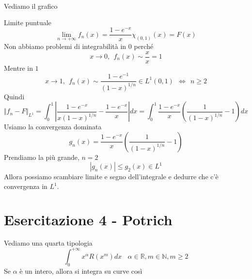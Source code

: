 Vediamo il grafico


Limite puntuale
\begin{equation*}
\lim\limits _{n\rightarrow +\infty } f_{n}( x) =\frac{1-e^{-x}}{x} \chi _{( 0,1)} (x)=F( x)
\end{equation*}
Non abbiamo problemi di integrabilità in $0$ perché
\begin{equation*}
x\rightarrow 0,\ \ f_{n}( x) \sim \frac{x}{x} =1
\end{equation*}
Mentre in $1$
\begin{equation*}
x\rightarrow 1,\ \ f_{n}( x) \sim \frac{1-e^{-1}}{( 1-x)^{1/n}} \in L^{1}( 0,1) \ \ \iff \ \ n\geqslant 2
\end{equation*}
Quindi
\begin{equation*}
\Vert f_{n} -F\Vert _{L^{1}} =\int ^{1}_{0}\left| \frac{1-e^{-x}}{x( 1-x)^{1/n}} -\frac{1-e^{-x}}{x}\right| dx=\int ^{1}_{0}\frac{1-e^{-x}}{x}\left(\frac{1}{( 1-x)^{1/n}} -1\right) dx
\end{equation*}
Usiamo la convergenza dominata
\begin{equation*}
g_{n}( x) =\frac{1-e^{-x}}{x}\left(\frac{1}{( 1-x)^{1/n}} -1\right)
\end{equation*}
Prendiamo la più grande, $n=2$
\begin{equation*}
| g_{n}( x)| \leqslant g_{2}( x) \in L^{1}
\end{equation*}
Allora possiamo scambiare limite e segno dell'integrale e dedurre che c'è convergenza in $L^{1}$.
\chapter{Esercitazione 4 - Potrich}
\ParteEsercizi
\Esercizio{}

Vediamo una quarta tipologia
\begin{equation*}
\boxed{\int ^{+\infty }_{0} x^{\alpha } R\left( x^{m}\right) dx} \ \ \ \ \alpha \in \mathbb{R} ,m\in \mathbb{N} ,m\geqslant 2
\end{equation*}
Se $\alpha $ è un intero, allora si integra su curve così


